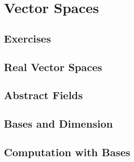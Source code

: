 \documentclass[]{book}
\begin{document}
\chapter{Vector Spaces}
\section*{Exercises}

\section{Real Vector Spaces}

\section{Abstract Fields}

\section{Bases and Dimension}

\section{Computation with Bases}

\end{document}
